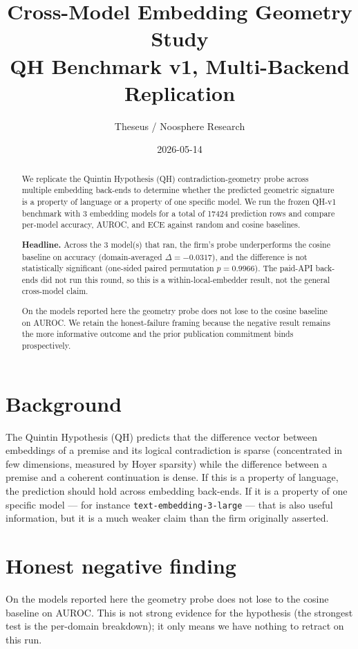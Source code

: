 \documentclass[11pt]{article}
\title{Cross-Model Embedding Geometry Study\\\large QH Benchmark v1, Multi-Backend Replication}
\author{Theseus / Noosphere Research}
\date{2026-05-14}
\begin{document}
\maketitle

\begin{abstract}We replicate the Quintin Hypothesis (QH) contradiction-geometry probe across multiple embedding back-ends to determine whether the predicted geometric signature is a property of language or a property of one specific model. We run the frozen QH-v1 benchmark with 3 embedding models for a total of 17424 prediction rows and compare per-model accuracy, AUROC, and ECE against random and cosine baselines.\par\textbf{Headline.} Across the 3 model(s) that ran, the firm's probe underperforms the cosine baseline on accuracy (domain-averaged $\Delta = -0.0317$), and the difference is not statistically significant (one-sided paired permutation $p = 0.9966$). The paid-API back-ends did not run this round, so this is a within-local-embedder result, not the general cross-model claim.\par On the models reported here the geometry probe does not lose to the cosine baseline on AUROC. We retain the honest-failure framing because the negative result remains the more informative outcome and the prior publication commitment binds prospectively.\end{abstract}

\section{Background}
The Quintin Hypothesis (QH) predicts that the difference vector between embeddings of a premise and its logical contradiction is sparse (concentrated in few dimensions, measured by Hoyer sparsity) while the difference between a premise and a coherent continuation is dense. If this is a property of language, the prediction should hold across embedding back-ends. If it is a property of one specific model — for instance \texttt{text-embedding-3-large} — that is also useful information, but it is a much weaker claim than the firm originally asserted.


\section{Honest negative finding}
On the models reported here the geometry probe does not lose to the cosine baseline on AUROC. This is not strong evidence for the hypothesis (the strongest test is the per-domain breakdown); it only means we have nothing to retract on this run.
\end{document}

